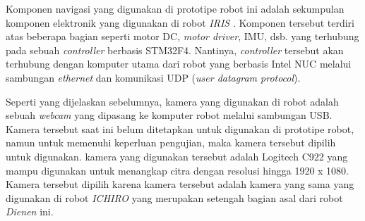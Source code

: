 Komponen navigasi yang digunakan di prototipe robot ini adalah sekumpulan komponen elektronik yang digunakan di robot \emph{IRIS} \citep{cit:dikairono2020}.
Komponen tersebut terdiri atas beberapa bagian seperti motor DC, \emph{motor driver}, IMU, dsb. yang terhubung pada sebuah \emph{controller} berbasis STM32F4.
Nantinya, \emph{controller} tersebut akan terhubung dengan komputer utama dari robot yang berbasis Intel NUC melalui sambungan \emph{ethernet} dan komunikasi UDP (\emph{user datagram protocol}).

Seperti yang dijelaskan sebelumnya, kamera yang digunakan di robot adalah sebuah \emph{webcam} yang dipasang ke komputer robot melalui sambungan USB.
Kamera tersebut saat ini belum ditetapkan untuk digunakan di prototipe robot,
  namun untuk memenuhi keperluan pengujian, maka kamera tersebut dipilih untuk digunakan.
kamera yang digunakan tersebut adalah Logitech C922 yang mampu digunakan untuk menangkap citra dengan resolusi hingga 1920 x 1080.
Kamera tersebut dipilih karena kamera tersebut adalah kamera yang sama yang digunakan di robot \emph{ICHIRO} \citep{cit:muhtadin2019} yang merupakan setengah bagian asal dari robot \emph{Dienen} ini.
